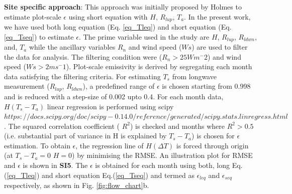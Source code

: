 \documentclass[fleqn,10pt]{wlscirep}
\begin{document}
{\textbf{Site specific approach}:
This approach was initially proposed by Holmes\cite{holmes_land_2009-1} to estimate plot-scale $\epsilon$ using short equation with $H$, $R_{lup}$, $T_{a}$. In the present work, we have used both long equation (Eq. \ref{eq_Tleq}) and short equation (Eq. \ref{eq_Tseq}) to estimate $\epsilon$.
The prime variable used in the study are $H$, $R_{lup}$, $R_{ldwn}$, and, $T_{a}$ while the ancillary variables $R_{n}$ and wind speed ($Ws$) are used to filter the data for analysis. The filtering condition were ($R_{n} > 25 Wm^-2$) and wind speed ($Ws > 2ms^-1$)\cite{holmes_land_2009}. Plot-scale emissivity is derived by segregating each month data satisfying the filtering criteria. For estimating $T_{s}$ from longwave measurement ($R_{lup}$, $R_{ldwn}$), a predefined range of $\epsilon$ is chosen starting from 0.998 and is reduced with a step-size of 0.002 upto 0.4. For each month data, $H (T_{s} - T_{a})$ linear regression is performed using scipy $https://docs.scipy.org/doc/scipy-0.14.0/reference/generated/scipy.stats.linregress.html$. The squared correlation coefficient (
$R^2$) is checked and months where $R^{2} > 0.5$ (i.e. substantial part of variance in H is explained by $T_{s} -T_{a}$) is chosen for $\epsilon$ estimation. To obtain $\epsilon$, the regression line of $H (\Delta T)$ is forced through origin (at $T_{s} - T_{a} = 0 $  $H=0$) by minimising the RMSE. An illustration plot for RMSE and $\epsilon$ is shown in \textbf{SI5}. The $\epsilon$ is obtained for each month using both, long Eq.(\ref{eq_Tleq}) and short equation Eq.(\ref{eq_Tseq}) and termed as $\epsilon_{leq}$ and $\epsilon_{seq}$ respectively, as shown in Fig. \ref{fig:flow_chart}b.
 
}
\end{document}
